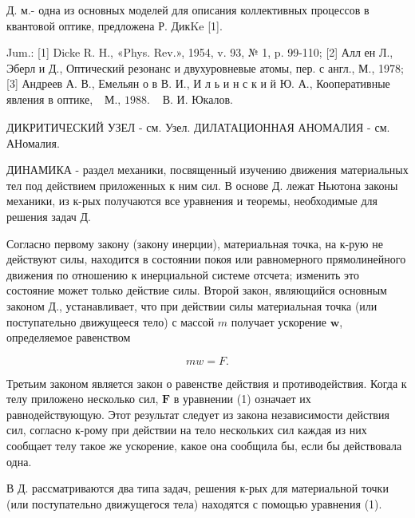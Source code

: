 \documentclass[10pt]{article}
\begin{document}
Д. м.- одна из основных моделей для описания коллективных процессов в квантовой оптике, предложена Р. ДикKe [1].



Jum.: [1] Dicke R. H., «Phys. Rev.», 1954, v. 93, № 1, p. 99-110; [2] Алл ен Л., Эберл и Д., Оптический резонанс и двухуровневые атомы, пер. с англ., М., 1978; [3] Андреев А. В., Емельян о в В. И., И л ь и н с к и й Ю. А., Кооперативные явления в оптике, $\begin{array}{ll}\text { М., } 1988 . & \text { В. И. Юкалов. }\end{array}$



ДИКРИТИЧЕСКИЙ УЗЕЛ - см. Узел. ДИЛАТАЦИОННАЯ АНОМАЛИЯ - см. АНомалия.



ДИНАМИКА - раздел механики, посвященный изучению движения материальных тел под действием приложенных к ним сил. В основе Д. лежат Ньютона законы механики, из к-рых получаются все уравнения и теоремы, необходимые для решения задач Д.



Согласно первому закону (закону инерции), материальная точка, на к-рую не действуют силы, находится в состоянии покоя или равномерного прямолинейного движения по отношению к инерциальной системе отсчета; изменить это состояние может только действие силы. Второй закон, являющийся основным законом Д., устанавливает, что при действии силы материальная точка (или поступательно движущееся тело) с массой $m$ получает ускорение $\boldsymbol{w}$, определяемое равенством



\[

m w=F .

\]



Третьим законом является закон о равенстве действия и противодействия. Когда к телу приложено несколько сил, $\boldsymbol{F}$ в уравнении (1) означает их равнодействующую. Этот результат следует из закона независимости действия сил, согласно к-рому при действии на тело нескольких сил каждая из них сообщает телу такое же ускорение, какое она сообщила бы, если бы действовала одна.



В Д. рассматриваются два типа задач, решения к-рых для материальной точки (или поступательно движущегося тела) находятся с помощью уравнения (1).
\end{document}
